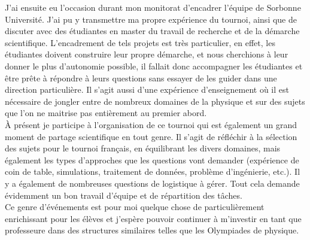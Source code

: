 \documentclass[a4paper,11pt]{article} %
\newcommand{\pointmedian}{\fontfamily{cmr}\selectfont\textperiodcentered}
\begin{document}
	J'ai ensuite eu l'occasion durant mon monitorat d'encadrer l'équipe de Sorbonne Université. J'ai pu y transmettre ma propre expérience du tournoi, ainsi que de discuter avec des étudiant\pointmedian es en master du travail de recherche et de la démarche scientifique. L'encadrement de tels projets est très particulier, en effet, les étudiant\pointmedian es doivent construire leur propre démarche, et nous cherchions à leur donner le plus d'autonomie possible, il fallait donc accompagner les étudiant\pointmedian es et être prête à répondre à leurs questions sans essayer de les guider dans une direction particulière. Il s'agit aussi d'une expérience d'enseignement où il est nécessaire de jongler entre de nombreux domaines de la physique et sur des sujets que l'on ne maitrise pas entièrement au premier abord.\\
	
	\`A présent je participe à l'organisation de ce tournoi qui est également un grand moment de partage scientifique en tout genre. Il s'agit de réfléchir à la sélection des sujets pour le tournoi français, en équilibrant les divers domaines, mais également les types d'approches que les questions vont demander (expérience de coin de table, simulations, traitement de données, problème d'ingénierie, etc.). Il y a également de nombreuses questions de logistique à gérer. Tout cela demande évidemment un bon travail d'équipe et de répartition des tâches.\\ %
	
	Ce genre d'événements est pour moi quelque chose de particulièrement enrichissant pour les élèves et j'espère pouvoir continuer à m'investir en tant que professeure dans des structures similaires telles que les Olympiades de physique.
	
	
\end{document}
